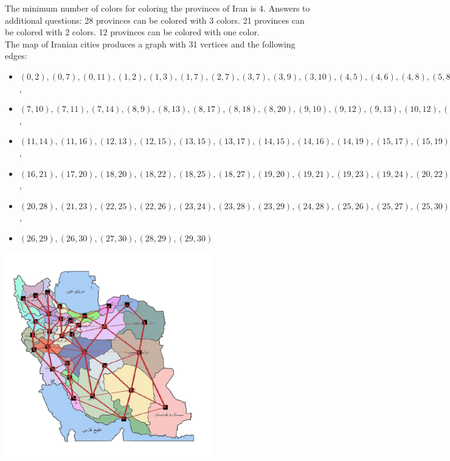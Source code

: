 \begin{solution}
The minimum number of colors for coloring the provinces of Iran is 4. Answers to additional questions: 28 provinces can be colored with 3 colors. 21 provinces can be colored with 2 colors. 12 provinces can be colored with one color. \\[0.2cm]

The map of Iranian cities produces a graph with 31 vertices and the following edges:

\begin{itemize}
	\item $(0, 2), (0, 7), (0, 11), (1, 2), (1, 3), (1, 7), (2, 7), (3, 7), ( 3, 9), (3, 10), (4, 5), (4, 6), (4, 8), (5, 8), (5, 9), (6, 8), (6, 18)$,
	\item $(7, 10), (7, 11), (7, 14), (8, 9), (8, 13), (8, 17), (8, 18), (8, 20) , (9, 10), (9, 12), (9, 13), (10, 12), (10, 14), (10, 15)$, 
	\item $ (11, 14), (11, 16), ( 12, 13), (12, 15), (13, 15), (13, 17), (14, 15), (14, 16), (14, 19), (15, 17), (15, 19), (15, 20), (16, 19)$,
	\item $(16, 21), (17, 20), (18, 20), (18, 22), (18, 25), (18, 27) , (19, 20), (19, 21), (19, 23), (19, 24),(20, 22), (20, 24), (20, 26)$,
	\item $(20, 28), ( 21, 23), (22, 25), (22, 26), (23, 24), (23, 28), (23, 29), (24, 28), (25, 26), (25, 27), (25, 30), (26, 28)$,
	\item $(26, 29), (26, 30), (27, 30), (28, 29), (29, 30)$
\end{itemize}  

\begin{center}
	\includegraphics[width=9cm]{43/figs/43_sol0.png}
\end{center}


\end{solution}
